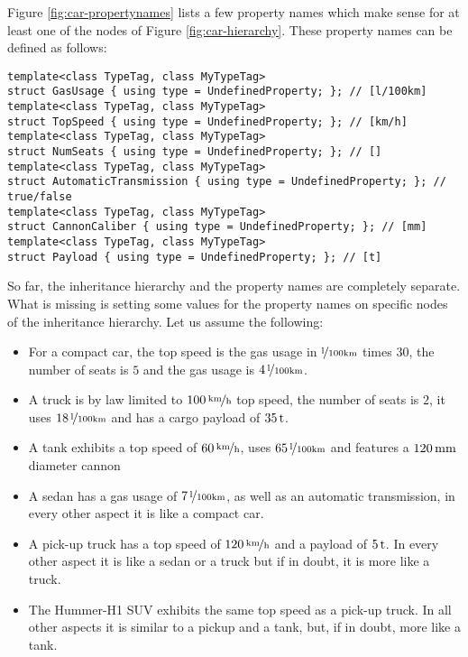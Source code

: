 Figure \ref{fig:car-propertynames} lists a few property names which
make sense for at least one of the nodes of Figure
\ref{fig:car-hierarchy}. These property names can be defined as
follows:
\begin{lstlisting}[name=propsyscars,style=DumuxCode]
template<class TypeTag, class MyTypeTag>
struct GasUsage { using type = UndefinedProperty; }; // [l/100km]
template<class TypeTag, class MyTypeTag>
struct TopSpeed { using type = UndefinedProperty; }; // [km/h]
template<class TypeTag, class MyTypeTag>
struct NumSeats { using type = UndefinedProperty; }; // []
template<class TypeTag, class MyTypeTag>
struct AutomaticTransmission { using type = UndefinedProperty; }; // true/false
template<class TypeTag, class MyTypeTag>
struct CannonCaliber { using type = UndefinedProperty; }; // [mm]
template<class TypeTag, class MyTypeTag>
struct Payload { using type = UndefinedProperty; }; // [t]
\end{lstlisting}

\noindent
So far, the inheritance hierarchy and the property names are completely
separate. What is missing is setting some values for the property
names on specific nodes of the inheritance hierarchy. Let us assume
the following:
\begin{itemize}
\item For a compact car, the top speed is the gas usage in $\unitfrac{l}{100km}$
  times $30$, the number of seats is $5$ and the gas usage is
  $\unitfrac[4]{l}{100km}$.
\item A truck is by law limited to $\unitfrac[100]{km}{h}$ top speed, the number
  of seats is $2$, it uses $\unitfrac[18]{l}{100km}$ and has a cargo payload of
  $\unit[35]{t}$.
\item A tank exhibits a top speed of $\unitfrac[60]{km}{h}$, uses $\unitfrac[65]{l}{100km}$
  and features a $\unit[120]{mm}$ diameter cannon
\item A sedan has a gas usage of $\unitfrac[7]{l}{100km}$, as well as an automatic
  transmission, in every other aspect it is like a compact car.
\item A pick-up truck has a top speed of $\unitfrac[120]{km}{h}$ and a payload of
  $\unit[5]{t}$. In every other aspect it is like a sedan or a truck but if in
  doubt, it is more like a truck.
\item The Hummer-H1 SUV exhibits the same top speed as a pick-up
  truck.  In all other aspects it is similar to a pickup and a tank,
  but, if in doubt, more like a tank.
\end{itemize}

